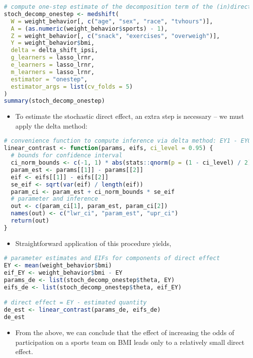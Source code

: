 \documentclass[
  12pt,
]{book}
\providecommand{\tightlist}{%
  \setlength{\itemsep}{0pt}\setlength{\parskip}{0pt}}
\theoremstyle{definition}
\theoremstyle{definition}
\theoremstyle{definition}
\newcommand{\1}{\mathbbm{1}}
\begin{document}
\begin{lstlisting}[language=R]
# compute one-step estimate of the decomposition term of the (in)direct effects
stoch_decomp_onestep <- medshift(
  W = weight_behavior[, c("age", "sex", "race", "tvhours")],
  A = (as.numeric(weight_behavior$sports) - 1),
  Z = weight_behavior[, c("snack", "exercises", "overweigh")],
  Y = weight_behavior$bmi,
  delta = delta_shift_ipsi,
  g_learners = lasso_lrnr,
  e_learners = lasso_lrnr,
  m_learners = lasso_lrnr,
  estimator = "onestep",
  estimator_args = list(cv_folds = 5)
)
summary(stoch_decomp_onestep)
\end{lstlisting}

\begin{itemize}
\tightlist
\item
  To estimate the stochastic direct effect, an extra step is necessary -- we
  must apply the delta method:
\end{itemize}

\begin{lstlisting}[language=R]
# convenience function to compute inference via delta method: EY1 - EY0
linear_contrast <- function(params, eifs, ci_level = 0.95) {
  # bounds for confidence interval
  ci_norm_bounds <- c(-1, 1) * abs(stats::qnorm(p = (1 - ci_level) / 2))
  param_est <- params[[1]] - params[[2]]
  eif <- eifs[[1]] - eifs[[2]]
  se_eif <- sqrt(var(eif) / length(eif))
  param_ci <- param_est + ci_norm_bounds * se_eif
  # parameter and inference
  out <- c(param_ci[1], param_est, param_ci[2])
  names(out) <- c("lwr_ci", "param_est", "upr_ci")
  return(out)
}
\end{lstlisting}

\begin{itemize}
\tightlist
\item
  Straightforward application of this procedure yields,
\end{itemize}

\begin{lstlisting}[language=R]
# parameter estimates and EIFs for components of direct effect
EY <- mean(weight_behavior$bmi)
eif_EY <- weight_behavior$bmi - EY
params_de <- list(stoch_decomp_onestep$theta, EY)
eifs_de <- list(stoch_decomp_onestep$theta, eif_EY)

# direct effect = EY - estimated quantity
de_est <- linear_contrast(params_de, eifs_de)
de_est
\end{lstlisting}

\begin{itemize}
\tightlist
\item
  From the above, we can conclude that the effect of increasing the odds of
  participation on a sports team on BMI leads only to a relatively small direct
  effect.
\end{itemize}

  

\backmatter
\printindex
\end{document}

